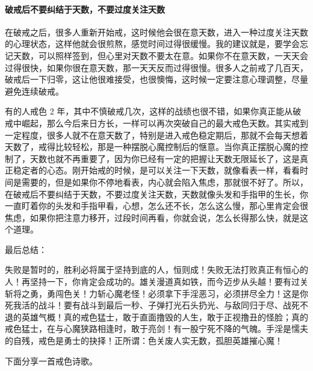 \paragraph{破戒后不要纠结于天数，不要过度关注天数}

在破戒之后，很多人重新开始戒，这时候他会很在意天数，进入一种过度关注天数的心理状态，这样他就会很煎熬，感觉时间过得很缓慢。我的建议就是，要学会忘记天数，可以照样签到，但心里对天数不要太在意。如果你不在意天数，一天天会过得很快，如果你很在意天数，那一天天反而过得很慢。很多人之前戒了几百天，破戒后一下归零，这让他很难接受，也很懊悔，这时候一定要注意心理调整，尽量避免连续破戒。

有的人戒色 2 年，其中不慎破戒几次，这样的战绩也很不错，如果你真正能从破戒中崛起，那么今后来日方长，一样可以再次突破自己的最大戒色天数。其实戒到一定程度，很多人就不在意天数了，特别是进入戒色稳定期后，那就不会每天想着天数了，戒得比较轻松，那是一种摆脱心魔控制后的惬意。当你真正摆脱心魔的控制了，天数也就不再重要了，因为你已经有一定的把握让天数无限延长了，这是真正稳定者的心态。刚开始戒的时候，是可以关注一下天数，就像看表一样，看看时间是需要的，但是如果你不停地看表，内心就会陷入焦虑，那就很不好了。所以，在破戒后不要纠结于天数，不要过度关注天数，天数就像头发和手指甲的生长，你一直盯着你的头发和手指甲看，心想，怎么还不长，怎么这么慢，那心里肯定会很焦虑，如果你把注意力移开，过段时间再看，你就会说，怎么长得那么快，就是这个道理。

最后总结：

失败是暂时的，胜利必将属于坚持到底的人，恒则成！失败无法打败真正有恒心的人！再坚持一下，你肯定会成功的。雄关漫道真如铁，而今迈步从头越！要有过关斩将之勇，勇闯色关！力斩心魔老怪！必须拿下手淫恶习，必须拼尽全力！这是你死我活的战斗！要有战斗到最后一秒、子弹打光石头扔光、与敌同归于尽、战死不退的英雄气概！真的戒色猛士，敢于直面撸毁的人生，敢于正视撸丑的怪脸；真的戒色猛士，在与心魔狭路相逢时，敢于亮剑！有一股宁死不降的气魄。手淫是懦夫的自残，戒色是勇士的抉择！正所谓：色关废人实无数，孤胆英雄摧心魔！

下面分享一首戒色诗歌。

